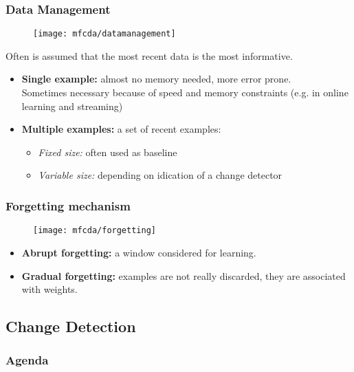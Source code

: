 \begin{frame}
\frametitle{Data Management}

\begin{figure}[H]
	\centering
	\texttt{[image: mfcda/datamanagement]}
\end{figure}


Often is assumed that the most recent data is the most informative.
\begin{itemize}
	\item \textbf{Single example:} almost no memory needed, more error prone.\\
	Sometimes necessary because of speed and memory constraints (e.g. in online learning and streaming)
	\item \textbf{ Multiple examples:} a set of recent examples:
	\begin{itemize}
		\item \textit{Fixed size:} often used as baseline
		\item \textit{Variable size:} depending on idication of a change detector
	\end{itemize}
\end{itemize}

\end{frame}



\begin{frame}
\frametitle{Forgetting mechanism}

\begin{figure}[H]
	\centering
	\texttt{[image: mfcda/forgetting]}
\end{figure}

\begin{itemize}
	\item \textbf{Abrupt forgetting:} a window considered for learning.
	\item \textbf{Gradual forgetting:} examples are not really discarded, they are associated with weights.
\end{itemize}


\end{frame}






\subsection{Change Detection}

\begin{frame}
\frametitle{Agenda}
\tableofcontents[currentsubsection]
\end{frame}

